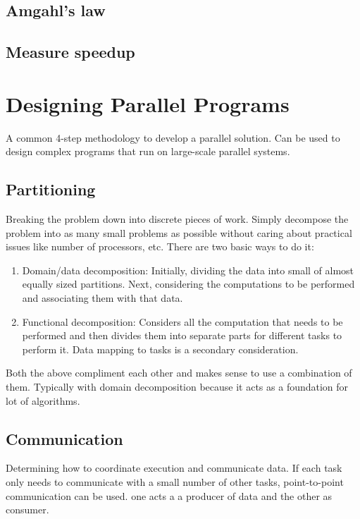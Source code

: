 \documentclass{scrartcl}
\begin{document}
\subsection{Amgahl's law}

\subsection{Measure speedup}

\section{Designing Parallel Programs}
A common 4-step methodology to develop a parallel solution. Can be used to design complex programs that run on large-scale parallel systems.

\subsection{Partitioning}
Breaking the problem down into discrete pieces of work.  Simply decompose the problem into as many small problems as possible without caring about practical issues like number of processors, etc. There are two basic ways to do it:

\begin{enumerate}
    \item Domain/data decomposition: Initially, dividing the data into small of almost equally sized partitions. Next, considering the computations to be performed and associating them with that data.
    \item Functional decomposition: Considers all the computation that needs to be performed and then divides them into separate parts for different tasks to perform it. Data mapping to tasks is a secondary consideration.
\end{enumerate}

Both the above compliment each other and makes sense to use a combination of them. Typically with domain decomposition because it acts as a foundation for lot of algorithms.

\subsection{Communication}
Determining how to coordinate execution and communicate data. If each task only needs to communicate with a small number of other tasks, point-to-point communication can be used. one acts a a producer of data and the other as consumer. 
\end{document}

